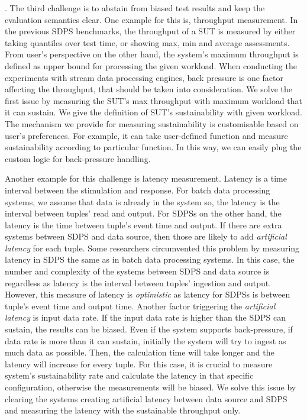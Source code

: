 .
The third challenge is to abstain from biased test results and keep the evaluation semantics clear.  One example for this is, throughput measurement. In the previous SDPS benchmarks, the throughput of a SUT is measured by either taking quantiles over test time, or showing max, min and average assessments. From user's perspective on the other hand, the system's maximum throughput is  defined as upper bound  for processing the given workload. When conducting the experiments with stream data processing engines, back pressure is one factor affecting the throughput, that should be taken into consideration.  We solve the first issue by measuring the SUT's max throughput with maximum workload that it can sustain. We give the definition of SUT's sustainability with given workload.
The mechanism we provide for measuring sustainability is customisable based on user's preferences. For example, it can take user-defined function and measure sustainability according to particular function. In this way, we can easily plug the custom logic for back-pressure handling. 

 Another example for this challenge is latency measurement. Latency is a time interval between the stimulation and response. For batch data processing systems, we assume that data is already in the system so, the latency is the interval between tuples' read and output. For SDPSs on the other hand, the latency is the time between tuple's event time and output. If there are extra systems between SDPS and data source, then those are likely to add \textit{artificial latency} for each tuple.  Some researchers circumvented this problem by measuring latency in SDPS the same as in batch data processing systems. In this case, the number and complexity of the systems between SDPS and data source is regardless as latency is the interval between tuples' ingestion and output. However, this measure of latency is \textit{optimistic} as latency for SDPSs is between tuple's event time and output time. Another factor triggering the \textit{artificial latency} is input data rate. If the input data rate is higher than the SDPS can sustain, the results can be biased. Even if the system supports back-pressure, if data rate is more than it can sustain, initially the system will try to ingest as much data as possible. Then, the calculation time will take longer and the latency will increase for every tuple. For this case, it is crucial to measure system's sustainability rate and calculate the latency in that specific configuration, otherwise the measurements will be biased.  We solve this issue by clearing the systems creating artificial latency between data source and SDPS and measuring the latency with the sustainable throughput only. 
 


